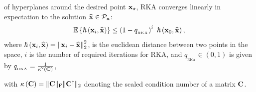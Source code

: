 \documentclass[12pt,draftcls,onecolumn]{IEEEtran}
\begin{document}
of hyperplanes around the desired point $\mathbf{x}_{\star}$,
RKA converges linearly in expectation to the solution $\widehat{\mathbf{x}}\in\mathcal{P}_{\mathbf{x}}$\cite{strohmer2009randomized,leventhal2010randomized}:
\begin{equation}
\label{eq:15}
\mathbb{E}\left\{\hbar\left(\mathbf{x}_{i},\widehat{\mbx}\right)\right\} \leq \left(1-q_{_{\text{RKA}}}\right)^{i}~ \hbar\left(\mathbf{x}_{0},\widehat{\mbx}\right),
\end{equation}
where $\hbar\left(\mathbf{x}_{i},\widehat{\mathbf{x}}\right)=\left\|\mathbf{x}_{i}-\widehat{\mathbf{x}}\right\|_{2}^{2}$, is the euclidean distance between two points in the space, %
$i$ is the number of required iterations for RKA, and $q_{_{\text{RKA}}} \in \left(0,1\right)$ is given by $q_{_{\text{RKA}}}=\frac{1}{\kappa^{2}\left(\mathbf{C}\right)}$,

with $\kappa\left(\mathbf{C}\right)=\|\mathbf{C}\|_{\mathrm{F}}\|\mathbf{C}^{\dagger}\|_{2}$ denoting the scaled condition number of a matrix $\mathbf{C}$.
\end{document}
